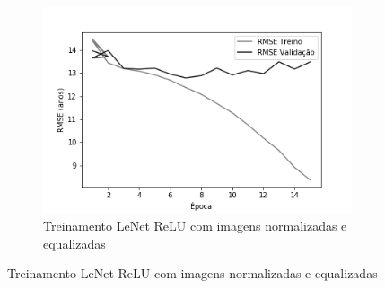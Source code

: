 \begin{figure}[hb!]
\begin{subfigure}[hb]{0.5\linewidth}
    \caption{Treinamento LeNet ReLU com imagens normalizadas e equalizadas}
    \label{fig:redeneuralbiologica}
    \includegraphics[width=\linewidth]{img/graficos-fase2/fig-history-lenet-relu-data-augmentation-21.png}%
  \end{subfigure}%
\end{figure}


